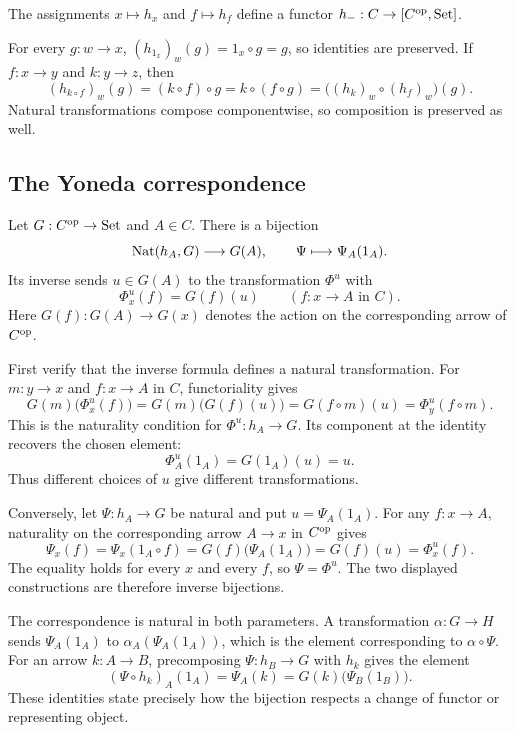 \begin{lemma}
The assignments $x\mapsto h_x$ and $f\mapsto h_f$ define a functor
$h_-:C\to[C^{\textrm{op}},{\textrm{Set}}]$.
\end{lemma}
\Proof
For every $g:w\to x$, $(h_{1_x})_w(g)=1_x\circ g=g$, so identities
are preserved. If $f:x\to y$ and $k:y\to z$, then
\[
(h_{k\circ f})_w(g)=(k\circ f)\circ g
 =k\circ(f\circ g)
 =\bigl((h_k)_w\circ(h_f)_w\bigr)(g).
\]
Natural transformations compose componentwise, so composition is
preserved as well.
\Done

\subsection{The Yoneda correspondence}
\begin{lemma}
Let $G:C^{\textrm{op}}\to{\textrm{Set}}$ and $A\in C$. There is a bijection
\[
{\textrm{Nat}}(h_A,G)\longrightarrow G(A),\qquad
\Psi\longmapsto\Psi_A(1_A).
\]
Its inverse sends $u\in G(A)$ to the transformation $\Phi^u$ with
\[
\Phi^u_x(f)=G(f)(u)\qquad(f:x\to A\text{ in }C).
\]
Here $G(f):G(A)\to G(x)$ denotes the action on the corresponding
arrow of $C^{\textrm{op}}$.
\end{lemma}
\Proof
First verify that the inverse formula defines a natural transformation.
For $m:y\to x$ and $f:x\to A$ in $C$, functoriality gives
\[
G(m)\bigl(\Phi^u_x(f)\bigr)
 =G(m)\bigl(G(f)(u)\bigr)
 =G(f\circ m)(u)
 =\Phi^u_y(f\circ m).
\]
This is the naturality condition for $\Phi^u:h_A\to G$.
Its component at the identity recovers the chosen element:
\[
\Phi^u_A(1_A)=G(1_A)(u)=u.
\]
Thus different choices of $u$ give different transformations.

Conversely, let $\Psi:h_A\to G$ be natural and put
$u=\Psi_A(1_A)$. For any $f:x\to A$, naturality on the corresponding
arrow $A\to x$ in $C^{\textrm{op}}$ gives
\[
\Psi_x(f)
 =\Psi_x(1_A\circ f)
 =G(f)\bigl(\Psi_A(1_A)\bigr)
 =G(f)(u)
 =\Phi^u_x(f).
\]
The equality holds for every $x$ and every $f$, so $\Psi=\Phi^u$.
The two displayed constructions are therefore inverse bijections.
\Done

The correspondence is natural in both parameters. A transformation
$\alpha:G\to H$ sends $\Psi_A(1_A)$ to
$\alpha_A(\Psi_A(1_A))$, which is the element corresponding to
$\alpha\circ\Psi$. For an arrow $k:A\to B$, precomposing
$\Psi:h_B\to G$ with $h_k$ gives the element
\[
(\Psi\circ h_k)_A(1_A)=\Psi_A(k)
 =G(k)\bigl(\Psi_B(1_B)\bigr).
\]
These identities state precisely how the bijection respects a change of
functor or representing object.


